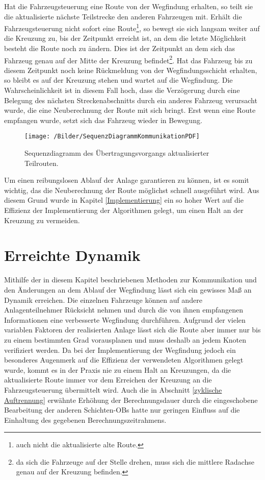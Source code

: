 		Hat die Fahrzeugsteuerung eine Route von der Wegfindung erhalten, so teilt sie die aktualisierte nächste Teilstrecke den anderen Fahrzeugen mit. Erhält die Fahrzeugsteuerung nicht sofort eine Route\footnote{auch nicht die aktualisierte alte Route.}, so bewegt sie sich langsam weiter auf die Kreuzung zu, bis der Zeitpunkt erreicht ist, an dem die letzte Möglichkeit besteht die Route noch zu ändern. Dies ist der Zeitpunkt an dem sich das Fahrzeug genau auf der Mitte der Kreuzung befindet\footnote{da sich die Fahrzeuge auf der Stelle drehen, muss sich die mittlere Radachse genau auf der Kreuzung befinden.}. Hat das Fahrzeug bis zu diesem Zeitpunkt noch keine Rückmeldung von der Wegfindungsschicht erhalten, so bleibt es auf der Kreuzung stehen und wartet auf die Wegfindung. Die Wahrscheinlichkeit ist in diesem Fall hoch, dass die Verzögerung durch eine Belegung des nächsten Streckenabschnitts durch ein anderes Fahrzeug verursacht wurde, die eine Neuberechnung der Route mit sich bringt. Erst wenn eine Route empfangen wurde, setzt sich das Fahrzeug wieder in Bewegung.
		
		\begin{figure}[h]
			\centering
			\texttt{[image: /Bilder/SequenzDiagrammKommunikationPDF]}
			\vspace{0.2cm}
			\caption{Sequenzdiagramm des Übertragungsvorgangs aktualisierter Teilrouten.}
		\end{figure}
		
		Um einen reibungslosen Ablauf der Anlage garantieren zu können, ist es somit wichtig, das die Neuberechnung der Route möglichst schnell ausgeführt wird. Aus diesem Grund wurde in Kapitel \ref{Implementierung} ein so hoher Wert auf die Effizienz der Implementierung der Algorithmen gelegt, um einen Halt an der Kreuzung zu vermeiden.
		
\section{Erreichte Dynamik}
	
	Mithilfe der in diesem Kapitel beschriebenen Methoden zur Kommunikation und den Änderungen an dem Ablauf der Wegfindung lässt sich ein gewisses Maß an Dynamik erreichen. Die einzelnen Fahrzeuge können auf andere Anlagenteilnehmer Rücksicht nehmen und durch die von ihnen empfangenen Informationen eine verbesserte Wegfindung durchführen. Aufgrund der vielen variablen Faktoren der realisierten Anlage lässt sich die Route aber immer nur bis zu einem bestimmten Grad vorausplanen und muss deshalb an jedem Knoten verifiziert werden. Da bei der Implementierung der Wegfindung jedoch ein besonderes Augenmerk auf die Effizienz der verwendeten Algorithmen gelegt wurde, kommt es in der Praxis nie zu einem Halt an Kreuzungen, da die aktualisierte Route immer vor dem Erreichen der Kreuzung an die Fahrzeugsteuerung übermittelt wird. Auch die in Abschnitt \ref{zyklische Auftrennung} erwähnte Erhöhung der Berechnungsdauer durch die eingeschobene Bearbeitung der anderen Schichten-\ac{OB}s hatte nur geringen Einfluss auf die Einhaltung des gegebenen Berechnungszeitrahmens.
